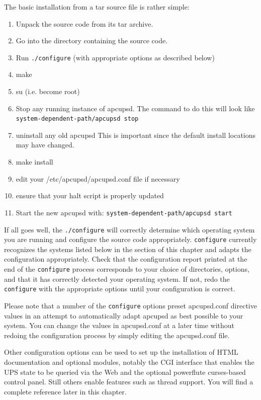 The basic installation from a tar source file is rather simple:  

\begin{enumerate}
\item Unpack the source code from its tar archive.  
\item Go into the directory containing the source code.  
\item Run {\tt ./configure} (with appropriate options as described below)  
\item make  
\item su (i.e. become root)  
\item Stop any running instance of apcupsd.  The command to do this will look
   like {\tt \lt{}system-dependent-path\gt{}/apcupsd stop}  
\item uninstall any old apcupsd This is important since the default install
   locations may have changed.  
\item make install  
\item edit your /etc/apcupsd/apcupsd.conf file if necessary  
\item ensure that your halt script is properly updated  
\item Start the new apcupsd with: {\tt \lt{}system-dependent-path\gt{}/apcupsd
   start}  
   \end{enumerate}

If all goes well, the {\tt ./configure} will correctly determine which
operating system you are running and configure the source code appropriately.
{\tt configure} currently recognizes the systems listed below in the 
section of this chapter and adapts the configuration appropriately.  Check
that the configuration report printed at the end of the {\tt configure}
process corresponds to your choice of directories, options, and that it has
correctly detected your operating system.  If not, redo the {\tt configure}
with the appropriate options until your configuration is correct.  

Please note that a number of the {\tt configure} options preset apcupsd.conf
directive values in an attempt to automatically adapt apcupsd as best possible
to your system.  You can change the values in apcupsd.conf at a later time
without redoing the configuration process by simply editing the apcupsd.conf
file.  

Other configuration options can be used to set up the installation of HTML
documentation and optional modules, notably the CGI interface that enables the
UPS state to be queried via the Web and the optional powerflute curses-based
control panel.  Still others enable features such as thread support.  You will
find a complete reference later in this chapter.  

